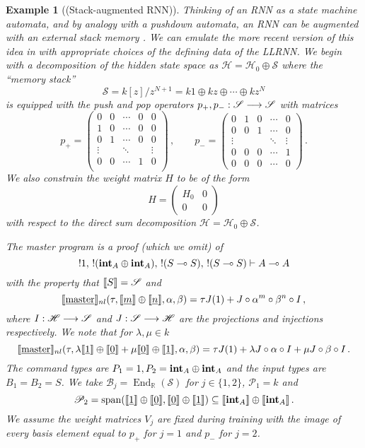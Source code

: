 \documentclass[english,letter paper,12pt,leqno]{article}
\theoremstyle{example}
\newtheorem{example}[theorem]{Example}
\numberwithin{equation}{section}
\def\be{\begin{equation}}
\def\ee{\end{equation}}
\DeclareMathOperator{\End}{End}
\begin{document}
\begin{example}[(Stack-augmented RNN)] Thinking of an RNN as a state machine automata, and by analogy with a pushdown automata, an RNN can be augmented with an external stack memory \cite{highorderrec}. We can emulate the more recent version of this idea in \cite{joulin} with appropriate choices of the defining data of the LLRNN. We begin with a decomposition of the hidden state space as $\mathscr{H} = \mathscr{H}_0 \oplus \mathscr{S}$ where the ``memory stack''
\be
\mathscr{S} = k[z]/z^{N+1} = k1 \oplus kz \oplus \cdots \oplus kz^N
\ee
is equipped with the push and pop operators $p_{+},p_{-}: \mathscr{S} \longrightarrow \mathscr{S}$ with matrices
\[
p_{+} = \begin{pmatrix} 0 & 0 & \cdots & 0 & 0 \\
1 & 0 & \cdots & 0 & 0 \\
0 & 1 & \cdots & 0 & 0\\
\vdots & & \ddots & & \vdots \\
0 & 0 & \cdots & 1 & 0\\
\end{pmatrix}\,,\qquad
p_{-} = \begin{pmatrix} 0 & 1 & 0 & \cdots & 0 \\
0 & 0 & 1 & \cdots & 0 \\
\vdots &  &  & \ddots & \vdots \\
0 & 0 & 0 & \cdots & 1\\
0 & 0 & 0 & \cdots & 0
\end{pmatrix}\,.
\]
We also constrain the weight matrix $H$ to be of the form
\[
H = \begin{pmatrix} H_0 & 0 \\ 0 & 0 \end{pmatrix}
\]
with respect to the direct sum decomposition $\mathscr{H} = \mathscr{H}_0 \oplus \mathscr{S}$. 

The master program is a proof (which we omit) of
\be
{!}1, \,{!}( \inta_A \oplus \inta_A ), \,{!}(S \multimap S), \,{!}(S \multimap S) \vdash A \multimap A
\ee
with the property that $\llbracket S \rrbracket = \mathscr{S}$ and
\[
\llbracket \underline{\textup{master}} \rrbracket_{nl}(\tau, \llbracket \underline{m} \rrbracket \oplus \llbracket \underline{n} \rrbracket, \alpha, \beta ) = \tau J(1) + J \circ \alpha^m \circ \beta^n \circ I\,,
\]
where $I: \mathscr{H} \longrightarrow \mathscr{S}$ and $J: \mathscr{S} \longrightarrow \mathscr{H}$ are the projections and injections respectively. We note that for $\lambda, \mu \in k$
\[
\llbracket \underline{\textup{master}} \rrbracket_{nl}( \tau, \lambda\llbracket \underline{1} \rrbracket \oplus \llbracket \underline{0} \rrbracket + \mu \llbracket \underline{0} \rrbracket \oplus \llbracket \underline{1} \rrbracket, \alpha, \beta ) = \tau J(1) + \lambda J \circ \alpha \circ I + \mu J \circ \beta \circ I\,.
\]
The command types are $P_1 = 1, P_2 = \textbf{int}_A \oplus \textbf{int}_A$ and the input types are $B_1 = B_2 = S$. We take $\mathscr{B}_j = \End_{\mathbb{R}}(\mathscr{S})$ for $j \in \{1,2\}$, $\mathscr{P}_1 = k$ and
\be
\mathscr{P}_2 = \operatorname{span}( \den{\underline{1}} \oplus \den{\underline{0}}, \den{\underline{0}} \oplus \den{\underline{1}} ) \subseteq \den{\inta_A} \oplus \den{\inta_A}\,.
\ee
We assume the weight matrices $V_j$ are fixed during training with the image of every basis element equal to $p_{+}$ for $j = 1$ and $p_{-}$ for $j = 2$. 


\end{example}
\end{document}
